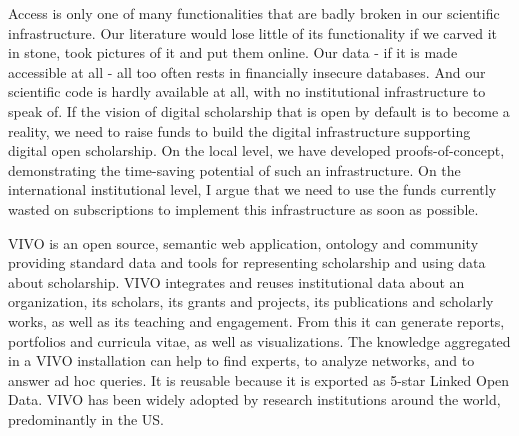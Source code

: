 \documentclass[a4paper,USenglish]{dagrep}
\begin{document}
{}
\license
{}
Access is only one of many functionalities that are badly broken in our
scientific infrastructure. Our literature would lose little of its functionality
if we carved it in stone, took pictures of it and put them online. Our data - if
it is made accessible at all - all too often rests in financially insecure
databases. And our scientific code is hardly available at all, with no
institutional infrastructure to speak of. If the vision of digital scholarship
that is open by default is to become a reality, we need to raise funds to build
the digital infrastructure supporting digital open scholarship. On the local
level, we have developed proofs-of-concept, demonstrating the time-saving
potential of such an infrastructure. On the international institutional level, I
argue that we need to use the funds currently wasted on subscriptions to
implement this infrastructure as soon as possible.

  
{}
\license

VIVO is an open source, semantic web application, ontology and community providing standard data and tools for representing scholarship and using data about scholarship.
VIVO integrates and reuses institutional data about an organization, its scholars, its grants and projects, its publications and scholarly works, as well as its teaching and engagement.
From this it can generate reports, portfolios and curricula vitae, as well as visualizations.
The knowledge aggregated in a VIVO installation can help to find experts, to analyze networks, and to answer ad hoc queries.
It is reusable because it is exported as 5-star Linked Open Data.
VIVO has been widely adopted by research institutions around the world, predominantly in the US.
\end{document}
